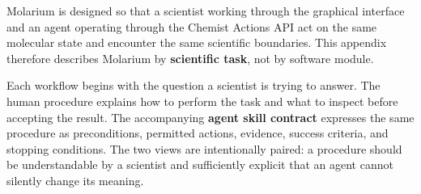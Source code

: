 \documentclass[11pt]{article}
\begin{document}
\newcommand{\workflowsection}[4]{%
  \par\nopagebreak[4]\vspace{7.5pt}%
  {\normalsize\bfseries #1\hspace{1.1em}#2}\par\vspace{2pt}%
  \lead{Status.}#3.\par\vspace{-3.5pt}%
  \lead{The question.}#4\par}

\newenvironment{skillcontract}[1]{%
  \par\nopagebreak[4]\vspace{2pt}%
  {\normalsize\bfseries Agent skill contract: \code{#1}}\par\vspace{1pt}%
  \footnotesize
  \begin{longtable}{@{}K V@{}}
  \toprule
  \textbf{Contract element} & \textbf{Requirement}\\
  \midrule
  \endfirsthead
  \toprule
  \textbf{Contract element} & \textbf{Requirement}\\
  \midrule
  \endhead
  \midrule
  \multicolumn{2}{r}{\footnotesize Continued on next page}\\
  \endfoot
  \bottomrule
  \endlastfoot
}{%
  \end{longtable}
  \small}
\newcommand{\contractrow}[2]{#1 & #2\\}

\newenvironment{smallcomparison}[1]{%
  \par\vspace{2pt}\footnotesize
  \begin{longtable}{@{}#1@{}}\toprule
}{%
  \bottomrule\end{longtable}
  \small}

Molarium is designed so that a scientist working through the graphical interface and an agent operating through the Chemist Actions API act on the same molecular state and encounter the same scientific boundaries. This appendix therefore describes Molarium by \textbf{scientific task}, not by software module.

Each workflow begins with the question a scientist is trying to answer. The human procedure explains how to perform the task and what to inspect before accepting the result. The accompanying \textbf{agent skill contract} expresses the same procedure as preconditions, permitted actions, evidence, success criteria, and stopping conditions. The two views are intentionally paired: a procedure should be understandable by a scientist and sufficiently explicit that an agent cannot silently change its meaning.
\end{document}
